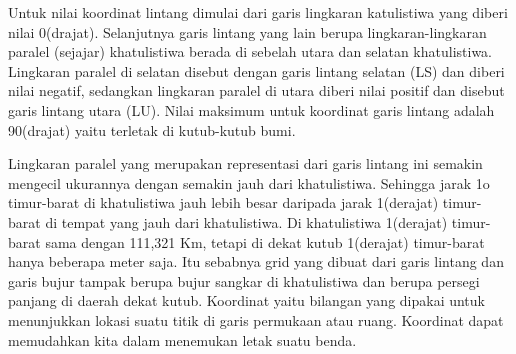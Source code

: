 Untuk nilai koordinat lintang dimulai dari garis lingkaran katulistiwa yang diberi nilai 0(drajat). Selanjutnya garis lintang yang lain berupa lingkaran-lingkaran paralel (sejajar) khatulistiwa berada di sebelah utara dan selatan khatulistiwa. Lingkaran paralel di selatan disebut dengan garis lintang selatan (LS) dan diberi nilai negatif, sedangkan lingkaran paralel di utara diberi nilai positif  dan disebut garis lintang utara (LU). Nilai maksimum untuk koordinat garis lintang adalah 90(drajat) yaitu terletak di kutub-kutub bumi.

Lingkaran paralel yang merupakan representasi dari garis lintang ini semakin mengecil ukurannya dengan semakin jauh dari khatulistiwa. Sehingga jarak 1o timur-barat di khatulistiwa jauh lebih besar daripada jarak 1(derajat) timur-barat di tempat yang jauh dari khatulistiwa. Di khatulistiwa 1(derajat) timur-barat sama dengan 111,321 Km, tetapi di dekat kutub 1(derajat) timur-barat hanya beberapa meter saja. Itu sebabnya grid yang dibuat dari garis lintang dan garis bujur tampak berupa bujur sangkar di khatulistiwa dan berupa persegi panjang di daerah dekat kutub. Koordinat yaitu bilangan yang dipakai untuk menunjukkan lokasi suatu titik di garis permukaan atau ruang. Koordinat dapat memudahkan kita dalam menemukan letak suatu benda.
